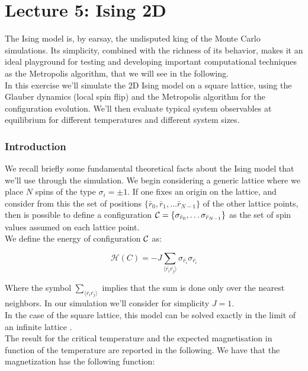\chapter*{Lecture 5: Ising 2D}

The Ising model is, by earsay, the undisputed king of the Monte Carlo simulations. Its simplicity, combined with the richness of its behavior, 
makes it an ideal playground for testing and developing important computational techniques as the Metropolis algorithm, that we will 
see in the following. \\
In this exercise we'll simulate the 2D Ising model on a square lattice, using the Glauber dynamics (local spin flip) and the Metropolis algorithm
for the configuration evolution. We'll then evaluate typical system observables at equilibrium for different temperatures and different system sizes.

\subsection{Introduction}

We recall briefly some fundamental theoretical facts about the Ising model that we'll use through the simulation.
We begin considering a generic lattice where we place $N$ spins of the type $\sigma_i  = \pm 1$. If one fixes an origin on the lattice, and consider
from this the set of positions $\{\bar{r}_0, \bar{r}_1, \dots \bar{r}_{N-1}\}$ of the other lattice points, then is possible 
to define a configuration $\mathcal{C} = \{\sigma_{\bar{r}_0}, \dots \sigma_{\bar{r}_{N-1}}\}$ as the set of spin values assumed on each lattice point. \\
We define the energy of configuration $\mathcal{C}$ as:

$$
\mathcal{H}(C) = -J \sum_{\langle \bar{r_i}\bar{r_j} \rangle} \sigma_{\bar{r_i}} \sigma_{\bar{r_i}}
$$

Where the symbol $\sum_{\langle \bar{r_i}\bar{r_j} \rangle}$ implies that the sum is done only over the nearest neighbors. In our simulation 
we'll consider for simplicity $J=1$. \\

In the case of the square lattice, this model can be solved exactly in the limit of an infinite lattice \cite{Onsager-1944}. \\
The result for the critical temperature and the expected magnetisation in function
of the temperature are reported in the following.
We have that the magnetization has the following function:

